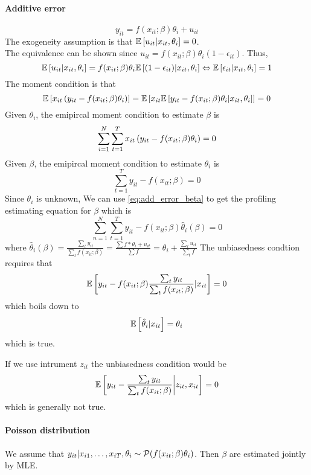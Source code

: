 \paragraph{Additive error}
\begin{equation*}
    y_{it} = f(x_{it};\beta)\theta_i+u_{it}
\end{equation*}
The exogeneity assumption is that $\mathbb{E}\left[u_{it}|x_{it},\theta_i\right]=0$.\\
The equivalence can be shown since $u_{it}=f(x_{it};\beta)\theta_i(1-\epsilon_{it})$. Thus, \begin{equation*}
    \mathbb{E}\left[u_{it}|x_{it},\theta_i\right]=f(x_{it};\beta)\theta_i\mathbb{E}\left[(1-\epsilon_{it})|x_{it},\theta_i\right] \Leftrightarrow \mathbb{E}\left[\epsilon_{it}|x_{it},\theta_i\right]=1
\end{equation*}
The moment condition is that \begin{equation*}
    \mathbb{E}\left[x_{it}\left(y_{it}-f(x_{it};\beta)\theta_i\right)\right]=\mathbb{E}\left[x_{it} \mathbb{E}\left[y_{it}-f(x_{it};\beta)\theta_i|x_{it},\theta_i\right]\right]=0
\end{equation*}
Given $\theta_i$, the emipircal moment condition to estimate $\beta$ is \begin{equation}
    \label{eq:add_error_beta}
    \sum_{i=1}^N\sum_{t=1}^T x_{it}\left(y_{it}-f(x_{it};{\beta}){\theta}_i\right)=0
\end{equation}
Given $\beta$, the emipircal moment condition to estimate $\theta_i$ is \begin{equation}
    \label{eq:add_error_theta}
    \sum_{t=1}^T {y_{it}-f(x_{it};{\beta})}=0
\end{equation}
Since $\theta_i$ is unknown, We can use \ref{eq:add_error_beta} to get the profiling estimating equation for $\beta$ which is \begin{equation*}
    \sum_{n=1}^N\sum_{t=1}^T{y_{it}-f(x_{it};\beta)\hat{\theta}_i(\beta)}=0
\end{equation*}
where $\hat{\theta}_i(\beta)=\frac{\sum_t y_{it}}{\sum_tf(x_{it};\beta)}=\frac{\sum f*\theta_i+u_{it}}{\sum f}=\theta_i+\frac{\sum_t u_{it}}{\sum_t f}$
The unbiasedness condtion requires that \begin{equation*}
    \mathbb{E}\left[y_{it}-f(x_{it};\beta)\frac{\sum_t y_{it}}{\sum_tf(x_{it};\beta)}|x_{it}\right]=0
\end{equation*}
which boils down to \begin{equation*}
    \mathbb{E}\left[\hat{\theta}_i|x_{it}\right]=\theta_i
\end{equation*} which is true.
\begin{remark}
    If we use intrument $z_{it}$ the unbiasedness condition would be \begin{equation*}
        \mathbb{E}\left[y_{it}-\frac{\sum_t y_{it}}{\sum_tf(x_{it};\beta)}\bigg |z_{it},x_{it}\right]=0
    \end{equation*} which is generally not true.
\end{remark}

\paragraph{Poisson distribution}
We assume that $y_{it}|x_{i1},\ldots,x_{iT},\theta_i \sim
    \mathcal{P}(f(x_{it};\beta)\theta_i)$. Then $\beta$ are estimated jointly by MLE.
